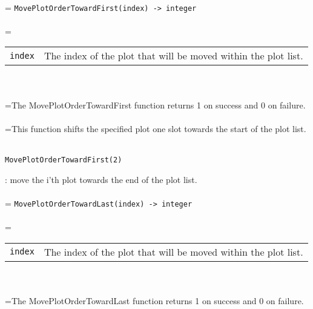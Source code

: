 \documentclass[10pt,a4paper]{report}
\begin{document}
 \\ 
\hangindent=\parindent 
\verb!MovePlotOrderTowardFirst(index) -> integer!\\ [-3mm]

 \\ 
\hangindent=\parindent 
\begin{tabular}{lp{9cm}}
\verb!index! & The index of the plot that will be moved within the plot list. \\
\end{tabular} \\[-2mm]


 \\ 
\hangindent=\parindent The MovePlotOrderTowardFirst function returns 1 on success and 0 on failure. \\[-3mm] 

 \\ 
\hangindent=\parindent This function shifts the specified plot one slot towards the start of the plot list. \\[-3mm] 

\\[-6mm]
\begin{verbatim}MovePlotOrderTowardFirst(2)
\end{verbatim}
\newpage


{}
: move the i'th plot towards the end of the plot list.\\[-3mm]

 \\ 
\hangindent=\parindent 
\verb!MovePlotOrderTowardLast(index) -> integer!\\ [-3mm]

 \\ 
\hangindent=\parindent 
\begin{tabular}{lp{9cm}}
\verb!index! & The index of the plot that will be moved within the plot list. \\
\end{tabular} \\[-2mm]


 \\ 
\hangindent=\parindent The MovePlotOrderTowardLast function returns 1 on success and 0 on failure. \\[-3mm] 
\end{document}
